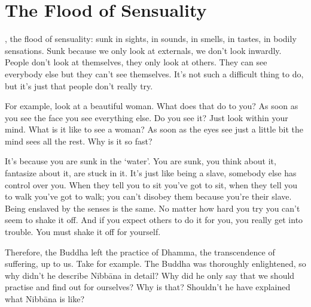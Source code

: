 
\chapter{The Flood of Sensuality}

\vspace*{0.5\baselineskip}
, the flood of sensuality: sunk in sights, in sounds, in smells, in tastes, in bodily sensations. Sunk because we only look at externals, we don't look inwardly. People don't look at themselves, they only look at others. They can see everybody else but they can't see themselves. It's not such a difficult thing to do, but it's just that people don't really try. 

For example, look at a beautiful woman. What does that do to you? As soon as you see the face you see everything else. Do you see it? Just look within your mind. What is it like to see a woman? As soon as the eyes see just a little bit the mind sees all the rest. Why is it so fast? 

It's because you are sunk in the `water'. You are sunk, you think about it, fantasize about it, are stuck in it. It's just like being a slave, somebody else has control over you. When they tell you to sit you've got to sit, when they tell you to walk you've got to walk; you can't disobey them because you're their slave. Being enslaved by the senses is the same. No matter how hard you try you can't seem to shake it off. And if you expect others to do it for you, you really get into trouble. You must shake it off for yourself. 

Therefore, the Buddha left the practice of Dhamma, the transcendence of suffering, up to us. Take  for example. The Buddha was thoroughly enlightened, so why didn't he describe Nibb\=ana in detail? Why did he only say that we should practise and find out for ourselves? Why is that? Shouldn't he have explained what Nibb\=ana is like? 

